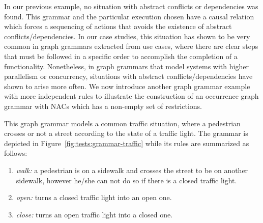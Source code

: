   In our previous example, no situation with abstract conflicts or dependencies was found.
  This grammar and the particular execution chosen have a causal relation which forces a sequencing of actions that avoids the existence of abstract conflicts/dependencies.
  In our case studies, this situation has shown to be very common in graph grammars extracted from use cases, where there are clear steps that must be followed in a specific order to accomplish the completion of a functionality.
  Nonetheless, in graph grammars that model systems with higher parallelism or concurrency, situations with abstract conflicts/dependencies have shown to arise more often. We now introduce another graph grammar example with more independent rules to illustrate the construction of an occurrence graph grammar with NACs which has a non-empty set of restrictions.

\begin{example} This graph grammar models a common traffic situation, where a pedestrian crosses or not a street according to the state of a traffic light. The grammar is depicted in Figure~\ref{fig:tests:grammar-traffic} while its rules are summarized as follows:

\begin{enumerate}[label=(\alph*),start=2]
  \item \emph{walk:} a pedestrian is on a sidewalk and crosses the street to be on another sidewalk, however he/she can not do so if there is a closed traffic light.
  \item \emph{open:} turns a closed traffic light into an open one.
  \item \emph{close:} turns an open traffic light into a closed one.
\end{enumerate}
\end{example}

